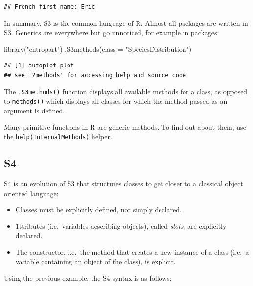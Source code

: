 \documentclass[
  12pt,
  american,
  a4paper,
  extrafontsizes,onecolumn,openright
  ]{memoir}
\newenvironment{Shaded}{\begin{snugshade}}{\end{snugshade}}
\newcommand{\AttributeTok}[1]{\textcolor[rgb]{0.77,0.63,0.00}{#1}}
\newcommand{\FunctionTok}[1]{\textcolor[rgb]{0.00,0.00,0.00}{#1}}
\newcommand{\NormalTok}[1]{#1}
\newcommand{\StringTok}[1]{\textcolor[rgb]{0.31,0.60,0.02}{#1}}
\providecommand{\tightlist}{%
  \setlength{\itemsep}{0pt}\setlength{\parskip}{0pt}}
\begin{document}
\begin{verbatim}
## French first name: Eric
\end{verbatim}

\normalsize

In summary, S3 is the common language of R.
Almost all packages are written in S3.
Generics are everywhere but go unnoticed, for example in packages:

\scriptsize

\begin{Shaded}
\begin{Highlighting}[]
\FunctionTok{library}\NormalTok{(}\StringTok{"entropart"}\NormalTok{)}
\FunctionTok{.S3methods}\NormalTok{(}\AttributeTok{class =} \StringTok{"SpeciesDistribution"}\NormalTok{)}
\end{Highlighting}
\end{Shaded}

\begin{verbatim}
## [1] autoplot plot    
## see '?methods' for accessing help and source code
\end{verbatim}

\normalsize

The \texttt{.S3methods()} function displays all available methods for a class, as opposed to \texttt{methods()} which displays all classes for which the method passed as an argument is defined.

Many primitive functions in R are generic methods.
To find out about them, use the \texttt{help(InternalMethods)} helper.

\hypertarget{s4}{%
\subsection{S4}\label{s4}}

S4 is an evolution of S3 that structures classes to get closer to a classical object oriented language:

\begin{itemize}
\tightlist
\item
  Classes must be explicitly defined, not simply declared.
\item
  1ttributes (i.e.~variables describing objects), called \emph{slots}, are explicitly declared.
\item
  The constructor, i.e.~the method that creates a new instance of a class (i.e.~a variable containing an object of the class), is explicit.
\end{itemize}

Using the previous example, the S4 syntax is as follows:
\end{document}

